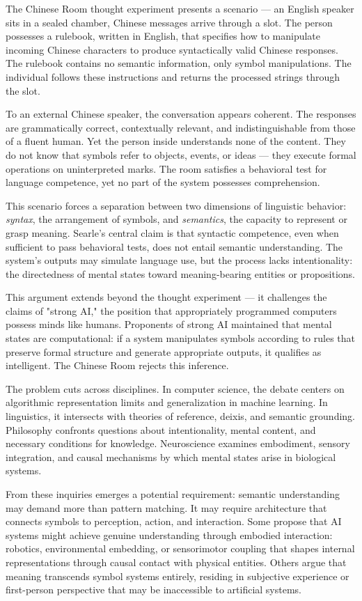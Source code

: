 The Chinese Room thought experiment presents a scenario — an English speaker sits in a sealed chamber, Chinese messages arrive through a slot. The person possesses a rulebook, written in English, that specifies how to manipulate incoming Chinese characters to produce syntactically valid Chinese responses. The rulebook contains no semantic information, only symbol manipulations. The individual follows these instructions and returns the processed strings through the slot.

To an external Chinese speaker, the conversation appears coherent. The responses are grammatically correct, contextually relevant, and indistinguishable from those of a fluent human. Yet the person inside understands none of the content. They do not know that symbols refer to objects, events, or ideas — they execute formal operations on uninterpreted marks. The room satisfies a behavioral test for language competence, yet no part of the system possesses comprehension.

This scenario forces a separation between two dimensions of linguistic behavior: \textit{syntax}, the arrangement of symbols, and \textit{semantics}, the capacity to represent or grasp meaning. Searle's central claim is that syntactic competence, even when sufficient to pass behavioral tests, does not entail semantic understanding. The system's outputs may simulate language use, but the process lacks intentionality: the directedness of mental states toward meaning-bearing entities or propositions.

This argument extends beyond the thought experiment — it challenges the claims of "strong AI," the position that appropriately programmed computers possess minds like humans. Proponents of strong AI maintained that mental states are computational: if a system manipulates symbols according to rules that preserve formal structure and generate appropriate outputs, it qualifies as intelligent. The Chinese Room rejects this inference.

The problem cuts across disciplines. In computer science, the debate centers on algorithmic representation limits and generalization in machine learning. In linguistics, it intersects with theories of reference, deixis, and semantic grounding. Philosophy confronts questions about intentionality, mental content, and necessary conditions for knowledge. Neuroscience examines embodiment, sensory integration, and causal mechanisms by which mental states arise in biological systems.

From these inquiries emerges a potential requirement: semantic understanding may demand more than pattern matching. It may require architecture that connects symbols to perception, action, and interaction. Some propose that AI systems might achieve genuine understanding through embodied interaction: robotics, environmental embedding, or sensorimotor coupling that shapes internal representations through causal contact with physical entities. Others argue that meaning transcends symbol systems entirely, residing in subjective experience or first-person perspective that may be inaccessible to artificial systems.


